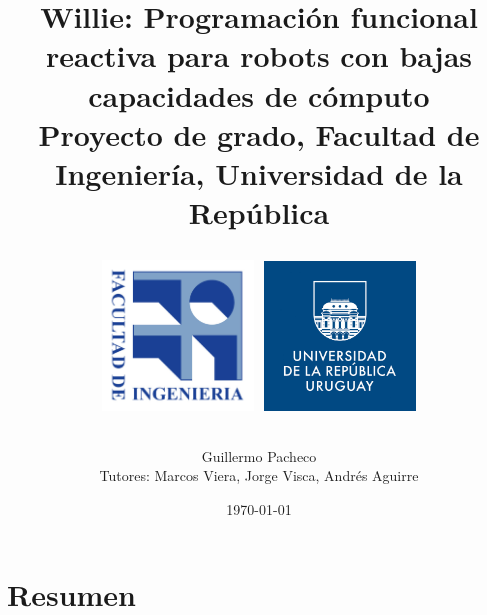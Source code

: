 \documentclass[12pt,a4paper,spanish]{book}
\newcommand{\frob}{Willie}
\begin{document}

\title{
  \frob: Programación funcional reactiva para robots con bajas capacidades de cómputo\\
    {\small Proyecto de grado, Facultad de Ingeniería, Universidad de la República}\\
  \begin{center}
    {\includegraphics[width=40mm]{fing.jpg}}
    {\includegraphics[width=40mm]{udelar.jpg}}
  \end{center}
}
\author{Guillermo Pacheco\\
{\small Tutores: Marcos Viera, Jorge Visca, Andrés Aguirre}}
\date{\today}

\maketitle


\chapter*{Resumen}



\cleardoublepage
{} %
\tableofcontents

\cleardoublepage
{} %
\listoffigures

\cleardoublepage
{} %
\listoftables
\end{document}
